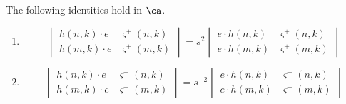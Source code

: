 \begin{lemma} \label{lemma:detgymnastics3}
The following identities hold in $\ca$. 
\leavevmode 
\begin{enumerate}
\item
\begin{equation*}
\begin{vmatrix}
h(n, k) \cdot e & \varsigma^+ (n, k) \\
h(m, k) \cdot e & \varsigma^+ (m, k)
\end{vmatrix}
= s^2
\begin{vmatrix}
e \cdot h(n, k) & \varsigma^+ (n, k) \\
e \cdot h(m, k) & \varsigma^+ (m, k)
\end{vmatrix}
\end{equation*}
\item
\begin{equation*}
\begin{vmatrix}
h(n, k) \cdot e & \varsigma^- (n, k) \\
h(m, k) \cdot e & \varsigma^- (m, k) 
\end{vmatrix}
= s^{-2}
\begin{vmatrix}
e \cdot h(n, k) & \varsigma^- (n, k) \\
e \cdot h(m, k) & \varsigma^- (m, k) 
\end{vmatrix}
\end{equation*}
\end{enumerate}
\end{lemma}
